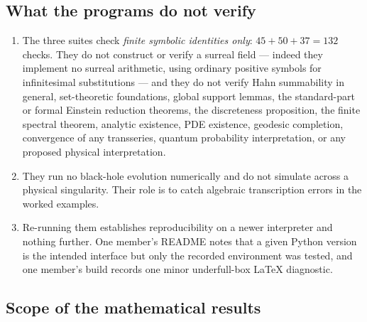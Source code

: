 \documentclass[11pt,letterpaper]{article}
\numberwithin{equation}{section}
\theoremstyle{definition}
\theoremstyle{remark}
\begin{document}
\subsection{What the programs do not verify}
\label{phys:app:sub:nc-programs}

\begin{enumerate}[label=\textup{N\arabic*.},leftmargin=3.0em,start=8]
\item The three suites check \emph{finite symbolic identities only}: $45+50+37
=132$ checks. They do not construct or verify a surreal field --- indeed they
implement no surreal arithmetic, using ordinary positive symbols for
infinitesimal substitutions --- and they do not verify Hahn summability in
general, set-theoretic foundations, global support lemmas, the standard-part or
formal Einstein reduction theorems, the discreteness proposition, the finite
spectral theorem, analytic existence, PDE existence, geodesic completion,
convergence of any transseries, quantum probability interpretation, or any
proposed physical interpretation.
\item They run no black-hole evolution numerically and do not simulate across a
physical singularity. Their role is to catch algebraic transcription errors in
the worked examples.
\item Re-running them establishes reproducibility on a newer interpreter and
nothing further. One member's README notes that a given Python version is the
intended interface but only the recorded environment was tested, and one
member's build records one minor underfull-box LaTeX diagnostic.
\end{enumerate}

\subsection{Scope of the mathematical results}
\label{phys:app:sub:nc-math}
\end{document}
